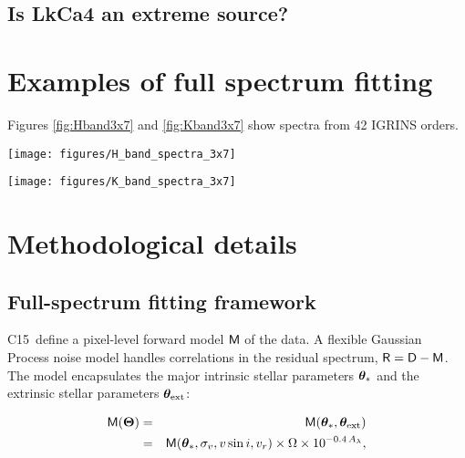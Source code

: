 \documentclass[twocolumn]{emulateapj}%
\newcommand{\iancze}{{\sc C15}}
\newcommand{\name}{LkCa4 }
\begin{document}
\subsection{Is \name an extreme source?}



\clearpage
\pagebreak


\appendix

\section{Examples of full spectrum fitting}

Figures \ref{fig:Hband3x7} and \ref{fig:Kband3x7} show spectra from 42 IGRINS orders.


\begin{figure*}
	\centering
	\texttt{[image: figures/H\_band\_spectra\_3x7]}
	\caption{IGRINS Orders 94 and $99-119$.  Note that the $y-$axis is on a logarithmic scale.  }
	\label{fig:Hband3x7}
\end{figure*}

\begin{figure*}
	\centering
	\texttt{[image: figures/K\_band\_spectra\_3x7]}
	\caption{IGRINS Orders $73-93$.  Note that the $y-$axis is on a logarithmic scale.  }
	\label{fig:Kband3x7}
\end{figure*}


\section{Methodological details}
\label{methods-details}

\subsection{Full-spectrum fitting framework}

\iancze\ define a pixel-level forward model $\mathsf{M}$ of the data.  A flexible Gaussian Process noise model handles correlations in the residual spectrum, $\mathsf{R}= \mathsf{D} - \mathsf{M}$.  The model encapsulates the major intrinsic stellar parameters ${\bm \theta}_{\ast}$ and the extrinsic stellar parameters ${\bm \theta}_{\rm ext}$:

\begin{eqnarray} \label{eqn:scaling}
\mathsf{M}({\bm \Theta}) &=& \mathsf{M}({\bm \theta}_{\ast}, {\bm \theta}_{\rm ext}) \\
         &=& \mathsf{M}({\bm \theta}_{\ast}, \sigma_v, v\sin{i}, v_r) \times \Omega \times 10^{-0.4\,A_{\lambda}}, \nonumber
\end{eqnarray}
\end{document}
